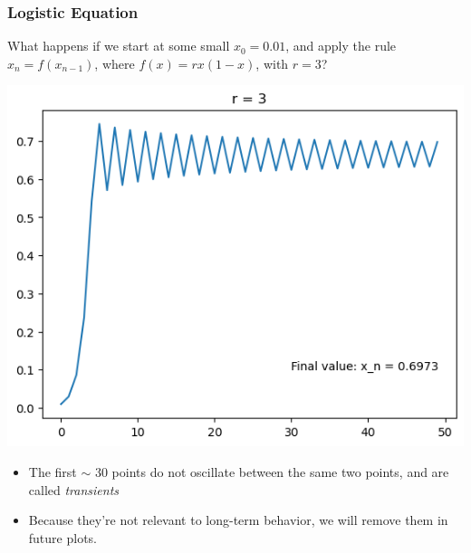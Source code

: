 \documentclass[9pt]{beamer}
\begin{document}
\begin{frame}
	\frametitle{Logistic Equation} 

	What happens if we start at some small \( x_0 = 0.01 \), and 
	apply the rule \( x_n = f(x_{n - 1}) \), where 
	\( f(x) = rx(1 - x) \), with \( r = 3 \)? 

	\pause
	\begin{center}
		\includegraphics[scale=0.4]{r=3.png}
	\end{center}

	\begin{itemize}
		\item The first \( \sim \) 30 points do not oscillate 
			between the same two points, 
			and are called \textit{transients}
		\item Because they're not relevant to long-term behavior, 
			we will remove them in future plots. 
	\end{itemize}
\end{frame}
\end{document}
